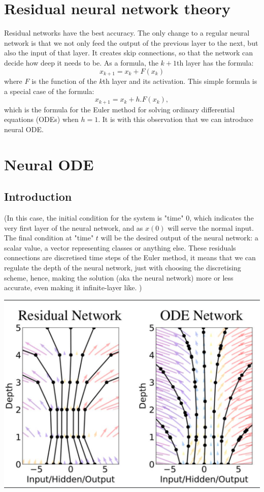 \documentclass[10pt,a4paper]{article}
\theoremstyle{definition}
\theoremstyle{theorem}
\begin{document}
\section{Residual neural network theory}

Residual networks have the best accuracy. The only change to a regular neural network is that we not only feed the output of the previous layer to the next, but also the input of that layer. It creates skip connections, so that the network can decide how deep it needs to be. As a formula, the $k+1$th layer has the formula:
\[
x_{k+1} = x_k + F(x_k)
\]
where $F$ is the function of the $k$th layer and its activation. This simple formula is a special case of the formula:
\[
x_{k+1} = x_k + h.F(x_k),
\]
which is the formula for the Euler method for solving ordinary differential equations (ODEs) when $h = 1$. It is with this observation that we can introduce neural ODE.


\section{Neural ODE}

\subsection{Introduction}

(In this case, the initial condition for the system is "time" $0$, which indicates the very first layer of the neural network, and as $x(0)$ will serve the normal input. The final condition at "time" $t$ will be the desired output of the neural network: a scalar value, a vector representing classes or anything else.
These residuals connections are discretised time steps of the Euler method, it means that we can regulate the depth of the neural network, just with choosing the discretising scheme, hence, making the solution (aka the neural network) more or less accurate, even making it infinite-layer like. )

\includegraphics[scale=1]{resnetvsodenet.png}
\end{document}
